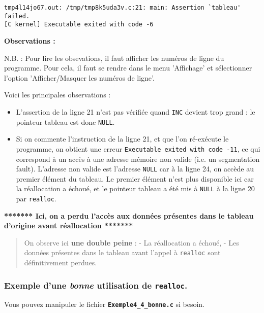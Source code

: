 \documentclass[11pt]{article}
\begin{document}
    \begin{Verbatim}[commandchars=\\\{\}]
tmp4l14jo67.out: /tmp/tmp8k5uda3v.c:21: main: Assertion `tableau' failed.
[C kernel] Executable exited with code -6
    \end{Verbatim}

    \textbf{Observations :}

N.B. : Pour lire les obsevations, il faut afficher les numéros de ligne
du programme. Pour cela, il faut se rendre dans le menu 'Affichage' et
sélectionner l'option 'Afficher/Masquer les numéros de ligne'.

Voici les principales observations :

\begin{itemize}
\item
  L'assertion de la ligne 21 n'est pas vérifiée quand \texttt{INC}
  devient trop grand : le pointeur tableau est donc \texttt{NULL}.
\item
  Si on commente l'instruction de la ligne 21, et que l'on ré-exécute le
  programme, on obtient une erreur
  \texttt{Executable\ exited\ with\ code\ -11}, ce qui correspond à un
  accès à une adresse mémoire non valide (i.e. un segmentation fault).
  L'adresse non valide est l'adresse \texttt{NULL} car à la ligne 24, on
  accède au premier élément du tableau. Le premier élément n'est plus
  disponible ici car la réallocation a échoué, et le pointeur tableau a
  été mis à \texttt{NULL} à la ligne 20 par \texttt{realloc}.
\end{itemize}

\textbf{******* Ici, on a perdu l'accès aux données présentes dans le
tableau d'origine avant réallocation *******}

\begin{quote}
On observe ici \textbf{une double peine} : - La réallocation a échoué, -
Les données présentes dans le tableau avant l'appel à \texttt{realloc}
sont définitivement perdues.
\end{quote}

    \subsubsection{\texorpdfstring{Exemple d'une \emph{bonne} utilisation de
\texttt{realloc}.}{Exemple d'une bonne utilisation de realloc.}}\label{exemple-dune-bonne-utilisation-de-realloc.}

Vous pouvez manipuler le fichier \textbf{\texttt{Exemple4\_4\_bonne.c}}
si besoin.
\end{document}
